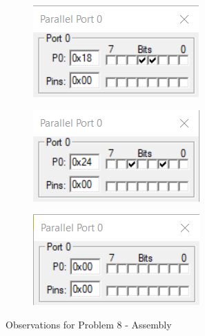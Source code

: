 \documentclass{lab_sheet}
\begin{document}
\begin{figure}[H]
\begin{subfigure}{.5\textwidth}
  \centering
  \includegraphics[frame,width=.8\linewidth]{../Figures/1_8_a.png}   
  \caption{}
  \label{fig:prob9-a}
\end{subfigure}
\begin{subfigure}{.5\textwidth}
  \centering
  \includegraphics[frame,width=.8\linewidth]{../Figures/1_8_e.png}   
  \caption{}
  \label{fig:prob9-b}
\end{subfigure}
\hspace*{\fill}
\begin{subfigure}{.5\textwidth}
  \centering
  \includegraphics[frame,width=.8\linewidth]{../Figures/1_8_d.png}   
  \caption{}
  \label{fig:prob9-c}
\end{subfigure}
\hspace*{\fill}
\caption{Observations for Problem 8 - Assembly}
\label{fig:prob9}
\end{figure}
\end{document}

